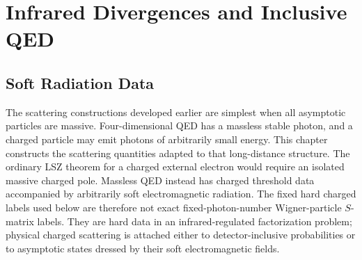 \chapter{Infrared Divergences and Inclusive QED}
\label{ch:volume-ii-infrared-inclusive-qed}
\ConventionsLorentzian


\section{Soft Radiation Data}

The scattering constructions developed earlier are simplest when all
asymptotic particles are massive.  Four-dimensional QED has a massless stable
photon, and a charged
particle may emit photons of arbitrarily small energy.  This chapter constructs
the scattering quantities adapted to that long-distance structure.
The ordinary LSZ theorem for a charged external electron would require an
isolated massive charged pole.
Massless QED instead has charged threshold data accompanied by arbitrarily
soft electromagnetic radiation.  The fixed hard charged labels used below are
therefore not exact fixed-photon-number Wigner-particle \(S\)-matrix labels.
They are hard data in an infrared-regulated factorization problem; physical
charged scattering is attached either to detector-inclusive probabilities or
to asymptotic states dressed by their soft electromagnetic fields.

